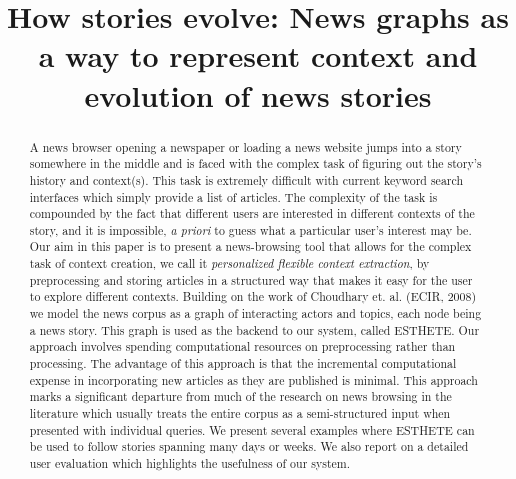 \documentclass{acm_proc_article-sp}
\begin{document}
\title{How stories evolve: News graphs as a way to represent context and evolution of news stories}

%
\author{
%
}


\maketitle
\begin{abstract}
A news browser opening a newspaper or loading a news website jumps
into a story somewhere in the middle and is faced with the complex
task of figuring out the story's history and context(s). This task is
extremely difficult with current keyword search interfaces which
simply provide a list of articles. The complexity of the task is
compounded by the fact that different users are interested in different
contexts of the story, and it is impossible, {\em a priori} to guess
what a particular user's interest may be. Our aim in this paper is to
present a news-browsing tool that allows for the complex task of
context creation, we call it {\em personalized flexible context
  extraction}, by preprocessing and storing articles in a structured
way that makes it easy for the user to explore different
contexts. Building on the work of Choudhary et. al. (ECIR, 2008) we
model the news corpus as a graph of interacting actors and topics,
each node being a news story. This graph is used as the backend to our
system, called ESTHETE.  Our approach involves spending computational
resources on preprocessing rather than processing. The advantage of
this approach is that the incremental computational expense in
incorporating new articles as they are published is minimal. This
approach marks a significant departure from much of the research on
news browsing in the literature which usually treats the entire corpus
as a semi-structured input when presented with individual queries. We
present several examples where ESTHETE can be used to follow stories
spanning many days or weeks. We also report on a detailed user
evaluation which highlights the usefulness of our system.

\end{abstract}
\end{document}
